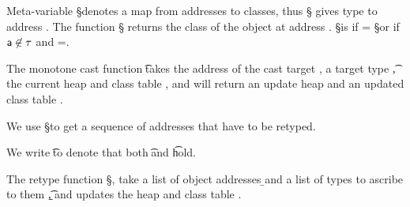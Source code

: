 \documentclass[a4paper,USenglish]{tex/lipics-v2016}
\begin{document}
Meta-variable \S denotes a map from addresses to classes, thus
\Map\S{\Bind\a\C} gives type \C to address \a. The function \htype\a\S\s\K
returns the class of the object at address \a.  \htype\a\S\s\K is \C if \C =
\App\S\a or if $\a\not\in\S$ and \obj\C{\b\a}=\App\s\a.


The monotone cast function \moncast\a\t\s\K\Kp\sp takes the address of the
cast target \a, a target type \t, the current heap \s and class table \K, and
will return an update heap \sp and an updated class table \Kp.

We use \Dom\S to get a sequence of addresses that have to be retyped.

\begin{mathpar}
\end{mathpar}


We write \t\EQ\tp to denote that both \StrSub{}\K\t\tp and
\StrSub{}\K\tp\t hold.

The retype function \retype{\b\a}{\b\t}\S\s\K, take a list of object
addresses \b\a and a list of types to ascribe to them \b\t, and updates the
heap \s and class table \K.


\begin{mathpar}


\end{mathpar}
\end{document}
